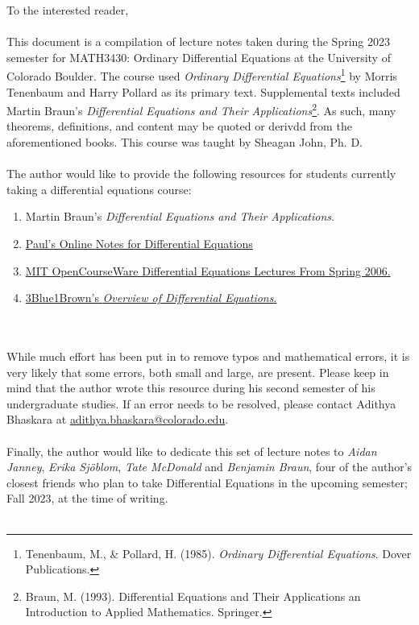 To the interested reader,
\\
\\
This document is a compilation of lecture notes taken during the Spring 2023 semester for MATH3430: Ordinary Differential Equations at the University of Colorado Boulder. The course used \textit{Ordinary Differential Equations}\footnote{Tenenbaum, M., \& Pollard, H. (1985). \textit{Ordinary Differential Equations}. Dover Publications. } by Morris Tenenbaum and Harry Pollard as its primary text. Supplemental texts included Martin Braun's \textit{Differential Equations and Their Applications}\footnote{Braun, M. (1993). Differential Equations and Their Applications an Introduction to Applied Mathematics. Springer.}. As such, many theorems, definitions, and content may be quoted or derivdd from the aforementioned books. This course was taught by Sheagan John, Ph. D.
\\
\\
The author would like to provide the following resources for students currently taking a differential equations course:
\begin{enumerate}
    \item Martin Braun's \textit{Differential Equations and Their Applications}.
    \item \href{https://tutorial.math.lamar.edu/classes/de/de.aspx}{Paul's Online Notes for Differential Equations}
    \item \href{https://www.youtube.com/playlist?list=PLEC88901EBADDD980}{MIT OpenCourseWare Differential Equations Lectures From Spring 2006.}
    \item \href{https://www.youtube.com/playlist?list=PLZHQObOWTQDNPOjrT6KVlfJuKtYTftqH6}{3Blue1Brown's \textit{Overview of Differential Equations}.}
\end{enumerate}
\vphantom
\\
\\
While much effort has been put in to remove typos and mathematical errors, it is very likely that some errors, both small and large, are present. Please keep in mind that the author wrote this resource during his second semester of his undergraduate studies. If an error needs to be resolved, please contact Adithya Bhaskara at \href{mailto:adithya.bhaskara@colorado.edu}{adithya.bhaskara@colorado.edu}.
\\
\\
Finally, the author would like to dedicate this set of lecture notes to \textit{Aidan Janney}, \textit{Erika Sj\"{o}blom}, \textit{Tate McDonald} and \textit{Benjamin Braun}, four of the author's closest friends who plan to take Differential Equations in the upcoming semester; Fall 2023, at the time of writing.
\\
\\
\vfill
{}